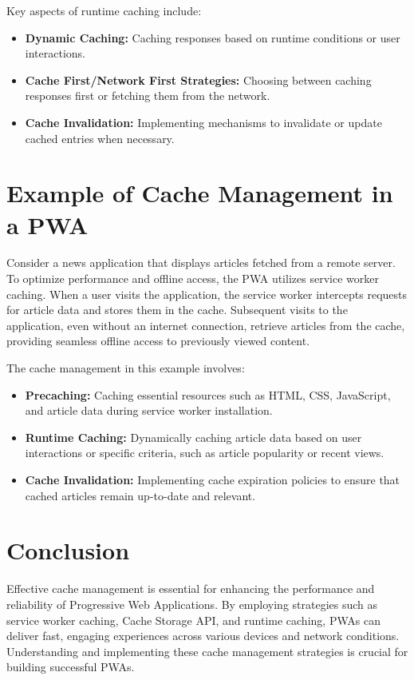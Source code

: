 \documentclass[12pt, a4paper, twoside]{article}
\begin{document}
Key aspects of runtime caching include:

\begin{itemize}
  \item \textbf{Dynamic Caching:} Caching responses based on runtime conditions or user interactions.
  
  \item \textbf{Cache First/Network First Strategies:} Choosing between caching responses first or fetching them from the network.
  
  \item \textbf{Cache Invalidation:} Implementing mechanisms to invalidate or update cached entries when necessary.
\end{itemize}

\section{Example of Cache Management in a PWA}
Consider a news application that displays articles fetched from a remote server. To optimize performance and offline access, the PWA utilizes service worker caching. When a user visits the application, the service worker intercepts requests for article data and stores them in the cache. Subsequent visits to the application, even without an internet connection, retrieve articles from the cache, providing seamless offline access to previously viewed content.

The cache management in this example involves:

\begin{itemize}
  \item \textbf{Precaching:} Caching essential resources such as HTML, CSS, JavaScript, and article data during service worker installation.
  
  \item \textbf{Runtime Caching:} Dynamically caching article data based on user interactions or specific criteria, such as article popularity or recent views.
  
  \item \textbf{Cache Invalidation:} Implementing cache expiration policies to ensure that cached articles remain up-to-date and relevant.
\end{itemize}

\section{Conclusion}
Effective cache management is essential for enhancing the performance and reliability of Progressive Web Applications. By employing strategies such as service worker caching, Cache Storage API, and runtime caching, PWAs can deliver fast, engaging experiences across various devices and network conditions. Understanding and implementing these cache management strategies is crucial for building successful PWAs.
\end{document}
